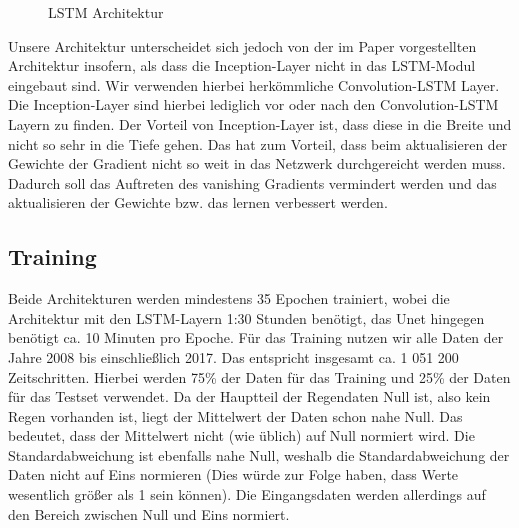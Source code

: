 \begin{figure}[h]
 \caption{LSTM Architektur}
\label{fig:LSTM-CNN}
\end{figure}

\noindent Unsere Architektur unterscheidet sich jedoch von der im Paper vorgestellten Architektur insofern, als dass die Inception-Layer nicht in das LSTM-Modul eingebaut sind.
Wir verwenden hierbei herkömmliche Convolution-LSTM Layer. Die Inception-Layer sind hierbei lediglich vor oder nach den Convolution-LSTM Layern zu finden.
Der Vorteil von Inception-Layer ist, dass diese in die Breite und nicht so sehr in die Tiefe gehen. Das hat zum Vorteil, dass beim aktualisieren der Gewichte der Gradient nicht so weit in das Netzwerk durchgereicht werden muss. Dadurch soll das Auftreten des vanishing Gradients vermindert werden und das aktualisieren der Gewichte bzw. das lernen verbessert werden.\\

\subsection{Training}
Beide Architekturen werden mindestens 35 Epochen trainiert, wobei die Architektur mit den LSTM-Layern 1:30 Stunden benötigt, das Unet hingegen benötigt ca. 10 Minuten pro Epoche.
Für das Training nutzen wir alle Daten der Jahre 2008 bis einschließlich 2017. Das entspricht insgesamt ca. 1 051 200 Zeitschritten. Hierbei werden 75\% der Daten für das Training und 25\% der Daten für das Testset verwendet.
Da der Hauptteil der Regendaten Null ist, also kein Regen vorhanden ist, liegt der Mittelwert der Daten schon nahe Null. Das bedeutet, dass der Mittelwert nicht (wie üblich) auf Null normiert wird.
Die Standardabweichung ist ebenfalls nahe Null, weshalb die Standardabweichung der Daten nicht auf Eins normieren (Dies würde zur Folge haben, dass Werte wesentlich größer als 1 sein können). 
Die Eingangsdaten werden allerdings auf den Bereich zwischen Null und Eins normiert.\\

